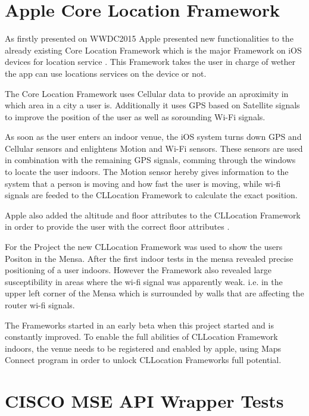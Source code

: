 \vspace{0.5cm}

\section{Apple Core Location Framework}

As firstly presented on WWDC2015 \cite{wwdc15}  Apple presented new functionalities to the already existing Core Location Framework which is the major Framework on iOS devices for location service \cite{CLlocation}. This Framework takes the user in charge of wether the app can use locations services on the device or not.

The Core Location Framework uses Cellular data to provide an aproximity in which area in a city a user is. Additionally it uses GPS based on Satellite signals to improve the position of the user as well as sorounding Wi-Fi signals.

As soon as the user enters an indoor venue, the iOS system turns down GPS and Cellular sensors and enlightens Motion and Wi-Fi sensors.
These sensors are used in combination with the remaining GPS signals, comming through the windows to locate the user indoors. The Motion sensor hereby gives information to the system that a person is moving and how fast the user is moving, while wi-fi signals are feeded to the CLLocation Framework to calculate the exact position.

Apple also added the altitude and floor attributes to the CLLocation Framework in order to provide the user with the correct floor attributes \cite{CLlocation}.

For the Project the new CLLocation Framework was used to show the users Positon in the Mensa. After the first indoor tests in the mensa revealed precise positioning of a user indoors. However the Framework also revealed large susceptibility in areas where the wi-fi signal was apparently weak. i.e. in the upper left corner of the Mensa which is surrounded by walls that are affecting the router wi-fi signals.

The Frameworks started in an early beta when this project started and is constantly improved. To enable the full abilities of CLLocation Framework indoors, the venue needs to be registered and enabled by apple, using Maps Connect program \cite{mapsConnect} in order to unlock CLLocation Frameworks full potential.


\vspace{0.5cm}

\section{CISCO MSE API Wrapper Tests}

